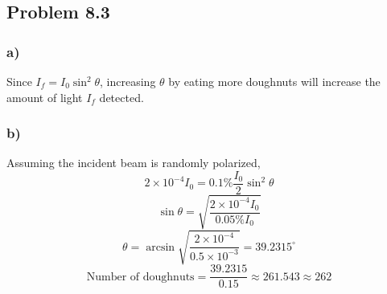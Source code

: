 \documentclass[../homework.tex]{subfiles}
\begin{document}
\subsection{Problem 8.3}
\subsubsection*{a)}
\indent \indent
Since $I_f = I_0 \sin^2 \theta$, increasing $\theta$ by eating more doughnuts will increase the amount of light $I_f$ detected.

\subsubsection*{b)}
\indent \indent
Assuming the incident beam is randomly polarized,
\begin{equation*}
    2 \times 10^{-4} I_0 = 0.1\% \frac{I_0}{2} \sin^2{\theta}
\end{equation*}
\begin{equation*}
    \sin \theta = \sqrt{\frac{2 \times 10^{-4} I_0}{0.05\% I_0}}
\end{equation*}
\begin{equation*}
    \theta = \arcsin \sqrt{\frac{2 \times 10^{-4}}{0.5 \times 10^{-3}}} = 39.2315^\circ
\end{equation*}
\begin{equation*}
    \text{Number of doughnuts} = \frac{39.2315}{0.15} \approx 261.543 \approx 262
\end{equation*}
\end{document}
